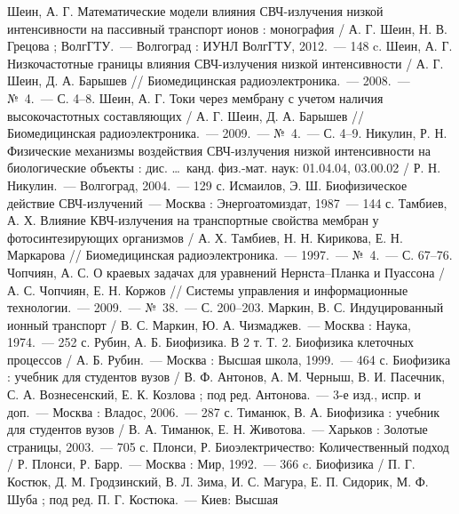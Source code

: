 \pagestyle{empty}
\def\bibname{СПИСОК ИСПОЛЬЗОВАННЫХ ИСТОЧНИКОВ}
\begin{thebibliography}{99}
 Шеин, А. Г. Математические модели влияния СВЧ-излучения низкой
    интенсивности на пассивный транспорт ионов : монография / А. Г. Шеин, Н. В.
    Грецова ; ВолгГТУ.~--- Волгоград : ИУНЛ ВолгГТУ, 2012.~--- 148 c.
 Шеин, А. Г. Низкочастотные границы влияния СВЧ-излучения низкой
    интенсивности / А. Г. Шеин, Д. А. Барышев // Биомедицинская радиоэлектроника.~---
    2008.~--- №~4.~--- С. 4--8.
 Шеин, А. Г. Токи через мембрану с учетом наличия высокочастотных
    составляющих / А. Г. Шеин, Д. А. Барышев // Биомедицинская радиоэлектроника.~---
    2009.~--- №~4.~--- С. 4--9.
 Никулин, Р. Н. Физические механизмы воздействия СВЧ-излучения
    низкой интенсивности на биологические объекты : дис. \ldots\ канд. физ.-мат.
    наук: 01.04.04, 03.00.02 / Р. Н. Никулин.~--- Волгоград, 2004.~--- 129 с.
 Исмаилов, Э. Ш. Биофизическое действие СВЧ-излучений~---
    Москва : Энергоатомиздат, 1987~--- 144 с.
 Тамбиев, А. Х. Влияние КВЧ-излучения на транспортные свойства
    мембран у фотосинтезирующих организмов / А. Х. Тамбиев, Н. Н. Кирикова,
    Е. Н. Маркарова // Биомедицинская радиоэлектроника.~--- 1997.~--- №~4.~--- С.
    67--76.
 Чопчиян, А. С. О краевых задачах для уравнений Нернста--Планка
    и Пуассона / А. С. Чопчиян, Е. Н. Коржов // Системы управления и
    информационные технологии.~--- 2009.~--- №~38.~--- С. 200--203.
 Маркин, В. С. Индуцированный ионный транспорт / В. С. Маркин,
    Ю. А. Чизмаджев.~--- Москва : Наука, 1974.~--- 252 с.
 Рубин, А. Б. Биофизика. В 2 т. Т. 2. Биофизика клеточных
    процессов / А. Б. Рубин.~--- Москва : Высшая школа, 1999.~--- 464 с.
 Биофизика : учебник для студентов вузов / В. Ф. Антонов, А. М.
    Черныш, В. И. Пасечник, С. А. Вознесенский, Е. К. Козлова ; под ред. Антонова.~---
    3-е изд., испр. и доп.~--- Москва : Владос, 2006.~--- 287 с.
 Тиманюк, В. А. Биофизика : учебник для студентов вузов /
    В. А. Тиманюк, Е. Н. Животова.~--- Харьков : Золотые страницы, 2003.~--- 705 с.
 Плонси, Р. Биоэлектричество: Количественный подход / Р. Плонси,
    Р. Барр.~--- Москва : Мир, 1992.~--- 366 c.
 Биофизика / П. Г. Костюк, Д. М. Гродзинский,
    В. Л. Зима, И. С. Магура, Е. П. Сидорик, М. Ф. Шуба ; под ред. П. Г. Костюка.~--- Киев: Высшая

\end{thebibliography}
